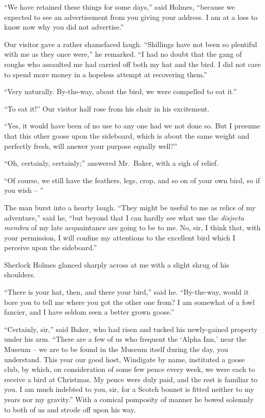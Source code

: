 “We have retained these things for some days,” said
Holmes, “because we expected to see an advertisement from
you giving your address. I am at a loss to know now why
you did not advertise.”

Our visitor gave a rather shamefaced laugh. “Shillings
have not been so plentiful with me as they once were,” he remarked.
“I had no doubt that the gang of roughs who assaulted
me had carried off both my hat and the bird. I did
not care to spend more money in a hopeless attempt at recovering
them.”

“Very naturally. By-the-way, about the bird, we were compelled
to eat it.”

“To eat it!” Our visitor half rose from his chair in his
excitement.

“Yes, it would have been of no use to any one had we not
done so. But I presume that this other goose upon the sideboard,
which is about the same weight and perfectly fresh,
will answer your purpose equally well?”

“Oh, certainly, certainly;” answered Mr.~Baker, with a sigh
of relief.

“Of course, we still have the feathers, legs, crop, and so on
of your own bird, so if you wish -- ”

The man burst into a hearty laugh. “They might be useful
to me as relics of my adventure,” said he, “but beyond
that I can hardly see what use the \textit{disjecta membra} of my late
acquaintance are going to be to me. No, sir, I think that,
with your permission, I will confine my attentions to the excellent
bird which I perceive upon the sideboard.”

Sherlock Holmes glanced sharply across at me with a slight
shrug of his shoulders.

“There is your hat, then, and there your bird,” said he.
“By-the-way, would it bore you to tell me where you got the
other one from? I am somewhat of a fowl fancier, and I
have seldom seen a better grown goose.”

“Certainly, sir,” said Baker, who had risen and tucked his
newly-gained property under his arm. “There are a few of
us who frequent the ‘Alpha Inn,’ near the Museum -- we are
to be found in the Museum itself during the day, you understand.
This year our good host, Windigate by name, instituted
a goose club, by which, on consideration of some few
pence every week, we were each to receive a bird at
Christmas. My pence were duly paid, and the rest is familiar to
you. I am much indebted to you, sir, for a Scotch bonnet is
fitted neither to my years nor my gravity.” With a comical
pomposity of manner he bowed solemnly to both of us and
strode off upon his way.

